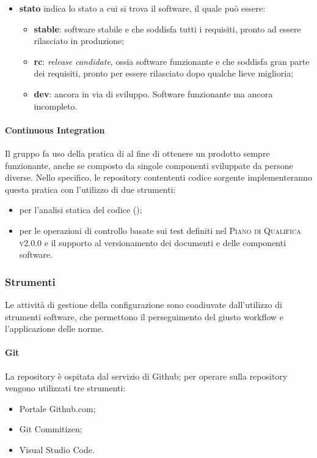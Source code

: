 \documentclass[../norme-di-progetto.tex]{subfiles}
\begin{document}
\begin{itemize}
\begin{itemize}
  \end{itemize}
  \item \textbf{stato} indica lo stato a cui si trova il software, il quale può essere:
  \begin{itemize}
    \item \textbf{stable}: software stabile e che soddisfa tutti i requisiti, pronto ad essere rilasciato in produzione;
    \item \textbf{rc}: \textit{release candidate}, ossia software funzionante e che soddisfa gran parte dei requisiti, pronto per essere rilasciato dopo qualche lieve miglioria;
    \item \textbf{dev}: ancora in via di sviluppo. Software funzionante ma ancora incompleto.
  \end{itemize}
\end{itemize}

\paragraph{Continuous Integration}
Il gruppo fa uso della pratica di  al fine di ottenere un prodotto sempre funzionante, anche se composto da singole componenti sviluppate da persone diverse. Nello specifico, le repository contententi codice sorgente implementeranno questa pratica con l'utilizzo di due strumenti:
\begin{itemize}
  \item \textbf{} per l'analisi statica del codice ();
  \item \textbf{} per le operazioni di controllo basate sui test definiti nel \textsc{Piano di Qualifica v2.0.0} e il supporto al versionamento dei documenti e delle componenti software.
\end{itemize}

\subsubsection{Strumenti}
Le attività di gestione della configurazione sono coadiuvate dall'utilizzo di strumenti software, che permettono il perseguimento del giusto workflow e l'applicazione delle norme.
\paragraph{Git}
La repository è ospitata dal servizio di  Github; per operare sulla repository vengono utilizzati tre strumenti:
\begin{itemize}
  \item Portale Github.com;
  \item Git Commitizen;
  \item Visual Studio Code.
\end{itemize}
\end{document}
